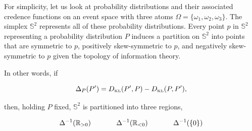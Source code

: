 \documentclass[11pt]{article}
\begin{document}
For simplicity, let us look at probability distributions and their
associated credence functions on an event space with three atoms
$\Omega=\{\omega_{1},\omega_{2},\omega_{3}\}$. The simplex
$\mathbb{S}^{2}$ represents all of these probability distributions.
Every point $p$ in $\mathbb{S}^{2}$ representing a probability
distribution $P$ induces a partition on $\mathbb{S}^{2}$ into points
that are symmetric to $p$, positively skew-symmetric to $p$, and
negatively skew-symmetric to $p$ given the topology of information
theory.

In other words, if

\begin{equation}
  \label{eq:sksy}
  \Delta_{P}(P')=D_{\mbox{\tiny KL}}(P',P)-D_{\mbox{\tiny KL}}(P,P'),
\end{equation}

then, holding $P$ fixed, $\mathbb{S}^{2}$ is partitioned into three
regions,

\begin{equation}
  \label{eq:sieruxis}
  \Delta^{-1}(\mathbb{R}_{>0})\hspace{.5in}\Delta^{-1}(\mathbb{R}_{<0})\hspace{.5in}\Delta^{-1}(\{0\})
\end{equation}
\end{document}
